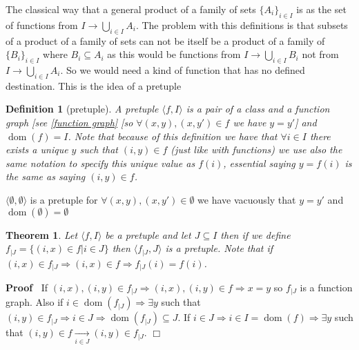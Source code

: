 \documentclass{book}
\newcommand{\Rightarrowlim}{\mathop{\rightarrow}\limits}
\newcommand{\tmop}[1]{\ensuremath{\operatorname{#1}}}
\newenvironment{proof}{\noindent\textbf{Proof\ }}{\hspace*{\fill}$\Box$\medskip}
\newtheorem{definition}{Definition}
{\theorembodyfont{\rmfamily}\newtheorem{example}{Example}}
\newtheorem{theorem}{Theorem}
\begin{document}
{{The classical way that a general product of a family of sets $\{ A_i \}_{i \in
I}$ is as the set of functions from $I \rightarrow \bigcup_{i \in I} A_i$. The
problem with this definitions is that subsets of a product of a family of sets
can not be itself be a product of a family of $\{ B_i \}_{i \in I}$ where $B_i
\subseteq A_i$ as this would be functions from $I \rightarrow \bigcup_{i \in
I} B_i$ not from $I \rightarrow \bigcup_{i \in I} A_i$. So we would need a
kind of function that has no defined destination. This is the idea of a
pretuple

\begin{definition}[pretuple]
  \label{pretuple}{}A pretuple $\langle f, I \rangle$ is a
  pair of a class and a function graph [see \ref{function graph} [so $\forall
  (x, y), (x, y') \in f$ we have $y = y'$] and $\tmop{dom} (f) = I$. Note that
  because of this definition we have that $\forall i \in I$ there exists a
  unique $y$ such that $(i, y) \in f$ (just like with functions) we use also
  the same notation to specify this unique value as $f (i)$, essential saying
  $y = f (i)$ is the same as saying $(i, y) \in f$.
\end{definition}

\begin{example}
  $\langle \emptyset, \emptyset \rangle$ is a pretuple for $\forall (x, y),
  (x, y') \in \emptyset$ we have vacuously that $y = y'$ and $\tmop{dom}
  (\emptyset) = \emptyset$
\end{example}

\begin{theorem}
  \label{subtuple}Let $\langle f, I \rangle$ be a pretuple and let $J
  \subseteq I$ then if we define $f_{|J} = \{ (i, x) \in f|i \in J \}$ then
  $\langle f_{|J}, J \rangle$ is a pretuple. Note that if $(i, x) \in f_{|J}
  \Rightarrow (i, x) \in f \Rightarrow f_{|J} (i) = f (i)$.
\end{theorem}

\begin{proof}
  If $(i, x), (i, y) \in f_{|J} \Rightarrow (i, x), (i, y) \in f \Rightarrow x
  = y$ so $f_{|J}$ is a function graph. Also if $i \in \tmop{dom} (f_{|J})
  \Rightarrow \exists y$ such that $(i, y) \in f_{|J} \Rightarrow i \in J
  \Rightarrow \tmop{dom} (f_{|J}) \subseteq J$. If $i \in J \Rightarrow i \in
  I = \tmop{dom} (f) \Rightarrow \exists y$ such that $(i, y) \in f
  \Rightarrowlim_{i \in J} (i, y) \in f_{|J} .$
\end{proof}

}}
\end{document}
